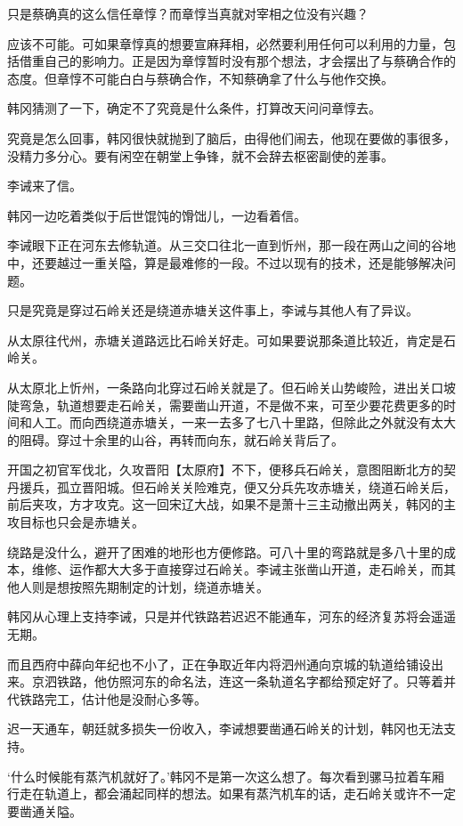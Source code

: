 只是蔡确真的这么信任章惇？而章惇当真就对宰相之位没有兴趣？

应该不可能。可如果章惇真的想要宣麻拜相，必然要利用任何可以利用的力量，包括借重自己的影响力。正是因为章惇暂时没有那个想法，才会摆出了与蔡确合作的态度。但章惇不可能白白与蔡确合作，不知蔡确拿了什么与他作交换。

韩冈猜测了一下，确定不了究竟是什么条件，打算改天问问章惇去。

究竟是怎么回事，韩冈很快就抛到了脑后，由得他们闹去，他现在要做的事很多，没精力多分心。要有闲空在朝堂上争锋，就不会辞去枢密副使的差事。

李诫来了信。

韩冈一边吃着类似于后世馄饨的馉饳儿，一边看着信。

李诫眼下正在河东去修轨道。从三交口往北一直到忻州，那一段在两山之间的谷地中，还要越过一重关隘，算是最难修的一段。不过以现有的技术，还是能够解决问题。

只是究竟是穿过石岭关还是绕道赤塘关这件事上，李诫与其他人有了异议。

从太原往代州，赤塘关道路远比石岭关好走。可如果要说那条道比较近，肯定是石岭关。

从太原北上忻州，一条路向北穿过石岭关就是了。但石岭关山势峻险，进出关口坡陡弯急，轨道想要走石岭关，需要凿山开道，不是做不来，可至少要花费更多的时间和人工。而向西绕道赤塘关，一来一去多了七八十里路，但除此之外就没有太大的阻碍。穿过十余里的山谷，再转而向东，就石岭关背后了。

开国之初官军伐北，久攻晋阳【太原府】不下，便移兵石岭关，意图阻断北方的契丹援兵，孤立晋阳城。但石岭关关险难克，便又分兵先攻赤塘关，绕道石岭关后，前后夹攻，方才攻克。这一回宋辽大战，如果不是萧十三主动撤出两关，韩冈的主攻目标也只会是赤塘关。

绕路是没什么，避开了困难的地形也方便修路。可八十里的弯路就是多八十里的成本，维修、运作都大大多于直接穿过石岭关。李诫主张凿山开道，走石岭关，而其他人则是想按照先期制定的计划，绕道赤塘关。

韩冈从心理上支持李诫，只是并代铁路若迟迟不能通车，河东的经济复苏将会遥遥无期。

而且西府中薛向年纪也不小了，正在争取近年内将泗州通向京城的轨道给铺设出来。京泗铁路，他仿照河东的命名法，连这一条轨道名字都给预定好了。只等着并代铁路完工，估计他是没耐心多等。

迟一天通车，朝廷就多损失一份收入，李诫想要凿通石岭关的计划，韩冈也无法支持。

‘什么时候能有蒸汽机就好了。’韩冈不是第一次这么想了。每次看到骡马拉着车厢行走在轨道上，都会涌起同样的想法。如果有蒸汽机车的话，走石岭关或许不一定要凿通关隘。

